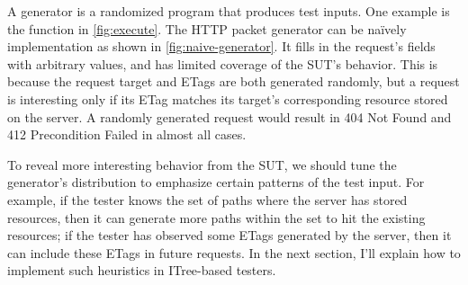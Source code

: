 A generator is a randomized program that produces test inputs.  One example is
the  function in \autoref{fig:execute}.  The HTTP packet
generator can be na\"ively implementation as shown in
\autoref{fig:naive-generator}.  It fills in the request's fields with arbitrary
values, and has limited coverage of the SUT's behavior.  This is because the
request target and ETags are both generated randomly, but a request is
interesting only if its ETag matches its target's corresponding resource stored
on the server.  A randomly generated request would result in 404 Not Found and
412 Precondition Failed in almost all cases.

To reveal more interesting behavior from the SUT, we should tune the generator's
distribution to emphasize certain patterns of the test input.  For example, if
the tester knows the set of paths where the server has stored resources, then it
can generate more paths within the set to hit the existing resources; if the
tester has observed some ETags generated by the server, then it can include
these ETags in future requests.  In the next section, I'll explain how to
implement such heuristics in ITree-based testers.
